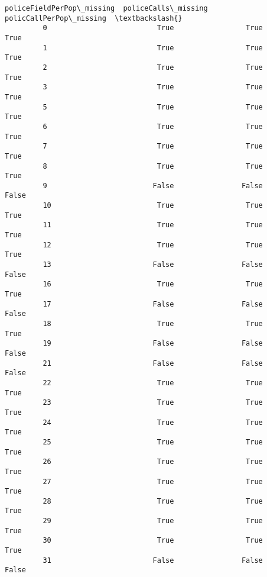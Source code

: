 \documentclass[11pt]{llncs}
\begin{document}
\begin{Verbatim}[commandchars=\\\{\}]
               policeFieldPerPop\_missing  policeCalls\_missing  policCallPerPop\_missing  \textbackslash{}
         0                          True                 True                     True   
         1                          True                 True                     True   
         2                          True                 True                     True   
         3                          True                 True                     True   
         5                          True                 True                     True   
         6                          True                 True                     True   
         7                          True                 True                     True   
         8                          True                 True                     True   
         9                         False                False                    False   
         10                         True                 True                     True   
         11                         True                 True                     True   
         12                         True                 True                     True   
         13                        False                False                    False   
         16                         True                 True                     True   
         17                        False                False                    False   
         18                         True                 True                     True   
         19                        False                False                    False   
         21                        False                False                    False   
         22                         True                 True                     True   
         23                         True                 True                     True   
         24                         True                 True                     True   
         25                         True                 True                     True   
         26                         True                 True                     True   
         27                         True                 True                     True   
         28                         True                 True                     True   
         29                         True                 True                     True   
         30                         True                 True                     True   
         31                        False                False                    False   

\end{Verbatim}
\end{document}
